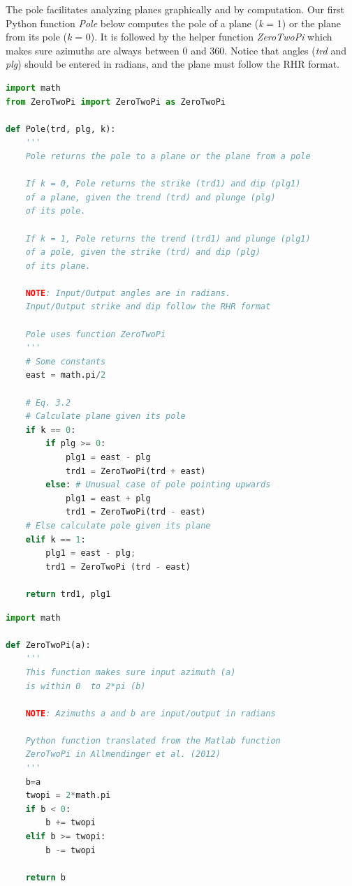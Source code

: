 \documentclass[a4paper , 12pt]{book}
\begin{document}
The pole facilitates analyzing planes graphically and by computation. Our first Python function \textit{Pole} below computes the pole of a plane (\textit{k} = 1) or the plane from its pole (\textit{k} = 0). It is followed by the helper function \textit{ZeroTwoPi} which makes sure azimuths are always between 0 and 360\degree. Notice that angles (\textit{trd} and \textit{plg}) should be entered in radians, and the plane must follow the RHR format.

\begin{center}
\begin{lstlisting}[language=Python, frame=single]
import math
from ZeroTwoPi import ZeroTwoPi as ZeroTwoPi

def Pole(trd, plg, k):
    '''
    Pole returns the pole to a plane or the plane from a pole  

    If k = 0, Pole returns the strike (trd1) and dip (plg1)
    of a plane, given the trend (trd) and plunge (plg) 
    of its pole.

    If k = 1, Pole returns the trend (trd1) and plunge (plg1) 
    of a pole, given the strike (trd) and dip (plg) 
    of its plane.

    NOTE: Input/Output angles are in radians. 
    Input/Output strike and dip follow the RHR format

    Pole uses function ZeroTwoPi
    '''
    # Some constants
    east = math.pi/2

    # Eq. 3.2
    # Calculate plane given its pole
    if k == 0:
        if plg >= 0:
            plg1 = east - plg
            trd1 = ZeroTwoPi(trd + east)
        else: # Unusual case of pole pointing upwards
            plg1 = east + plg
            trd1 = ZeroTwoPi(trd - east) 
    # Else calculate pole given its plane
    elif k == 1:
    	plg1 = east - plg;
    	trd1 = ZeroTwoPi (trd - east)
        
    return trd1, plg1
\end{lstlisting}
\end{center}

\begin{center}
\begin{lstlisting}[language=Python, frame=single]
import math

def ZeroTwoPi(a):
    '''
    This function makes sure input azimuth (a)
    is within 0  to 2*pi (b)
    
    NOTE: Azimuths a and b are input/output in radians
    
    Python function translated from the Matlab function 
    ZeroTwoPi in Allmendinger et al. (2012)
    '''
    b=a
    twopi = 2*math.pi
    if b < 0:
        b += twopi
    elif b >= twopi:
        b -= twopi
        
    return b
\end{lstlisting}    
\end{center}
\end{document}
